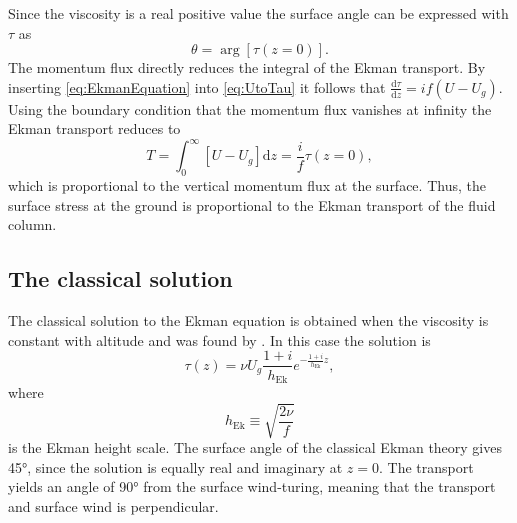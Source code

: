 Since the viscosity is a real positive value the surface angle can be expressed with $\tau$ as
\begin{equation}
\theta = \arg\left[\tau(z=0)\right].
\end{equation}
The momentum flux directly reduces the integral of the Ekman transport. By inserting \autoref{eq:EkmanEquation} into \ref{eq:UtoTau} it follows that $\frac{\mathrm{d}\tau}{\mathrm{d}z}=if\left(U-U_g\right)$. Using the boundary condition that the momentum flux vanishes at infinity the Ekman transport reduces to
\begin{equation}
T = \int_0^\infty \left[U - U_g\right] \mathrm{d}z = \frac{i}{f}\tau(z=0),
\label{eq:Transport}
\end{equation}
which is proportional to the vertical momentum flux at the surface. Thus, the surface stress at the ground is proportional to the Ekman transport of the fluid column.

\subsection{The classical solution}
The classical solution to the Ekman equation is obtained when the viscosity is constant with altitude and was found by \citet{ekman1905}. In this case the solution is
\begin{equation}
    \tau(z)=\nu U_g \frac{1+i}{h_\text{Ek}} e^{- \frac{1+i}{h_\text{Ek}} z},
    \label{eq:EkmanConstant}
\end{equation}
where
\begin{equation}
    h_\text{Ek}\equiv\sqrt{\frac{2\nu}{f}}
    \label{eq:EkmanHeight}
\end{equation}
is the Ekman height scale. The surface angle of the classical Ekman theory gives \ang{45}, since the solution is equally real and imaginary at $z=0$. The transport yields an angle of \ang{90} from the surface wind-turing, meaning that the transport and surface wind is perpendicular.

